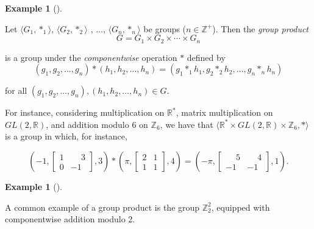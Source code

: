 \documentclass[10pt,]{book}
\theoremstyle{plain}
\theoremstyle{definition}
\theoremstyle{definition}
\theoremstyle{definition}
\newtheorem{example}[theorem]{Example}
\theoremstyle{definition}
\numberwithin{equation}{section}
\def\Z{\mathbb{Z}}
\def\R{\mathbb{R}}
\newcommand{\amp}{ & }
\begin{document}
\begin{example}[]\label{gpprod}

        Let \(\langle G_1,*_1\rangle\), \(\langle G_2,*_2\rangle\) , \(\ldots\), \(\langle G_n,*_n\rangle\) be groups (\(n\in \Z^+\)). Then the \emph{group product}
\begin{equation*}

          G=G_1\times G_2\times \cdots \times G_n
        
\end{equation*}

        is a group under the \emph{componentwise} operation \(*\) defined by
\begin{equation*}

          (g_1,g_2,\ldots, g_n)*(h_1,h_2,\ldots,h_n)=(g_1*_1h_1, g_2*_2h_2,\ldots, g_n*_nh_n)
        
\end{equation*}

        for all \((g_1,g_2,\ldots, g_n),(h_1,h_2,\ldots,h_n)\in G\).
\par

        For instance, considering multiplication on \(\R^*\), matrix multiplication on \(GL(2,\R)\), and addition modulo \(6\) on \(\Z_6\), we have that \(\langle \R^*\times GL(2,\R) \times \Z_6,*\rangle\) is a group in which, for instance,

\begin{equation*}

          \left(-1, \begin{bmatrix}
          1 \amp  \phantom{-}3 \\
          0 \amp  -1
          \end{bmatrix},
          3\right)
          *\left(\pi,
                    \begin{bmatrix}
          2 \amp  1 \\
          1 \amp  1
          \end{bmatrix},
4\right)=\left(-\pi, 
          \begin{bmatrix}
          \phantom{-}5 \amp  \phantom{-}4 \\
          -1 \amp -1
          \end{bmatrix} 
          ,1\right).
        
\end{equation*}

\end{example}
\begin{example}[]\label{example-24}

        A common example of a group product is the group \(\Z_2^2\), equipped with componentwise addition modulo 2.
\end{example}
\end{document}
